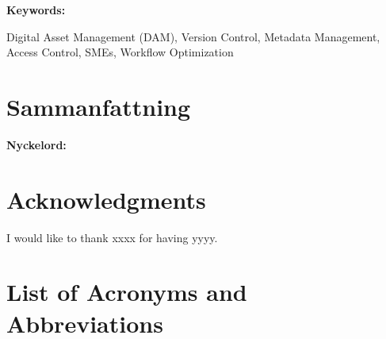 \documentclass[a4paper,10pt,twocolumn]{article}
\numberwithin{figure}{section}
\numberwithin{table}{section}
\begin{document}
\vspace{0.3cm} 
\textbf{Keywords:} 
    
Digital Asset Management (DAM), Version Control, Metadata Management, Access Control, SMEs, Workflow Optimization

\section*{Sammanfattning}

\vspace{0.3cm} 
\textbf{Nyckelord:} 
\newpage

\section*{Acknowledgments}
I would like to thank xxxx for having yyyy.

\newpage
{} 
\onecolumn
\tableofcontents
\newpage

\newpage
{} 
{}
\listoffigures
\newpage
{} 
{}
\listoftables

\newpage
{}
{}
\section*{List of Acronyms and Abbreviations}
\vspace{0.2cm} %
\end{document}

